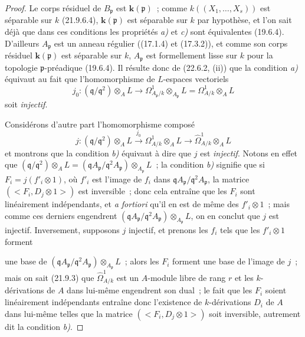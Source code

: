 \begin{proof}
Le corps résiduel de $B_{\mathfrak p}$ est $\boldsymbol{k}(\mathfrak p)$~; comme
$k((X_1,\ldots,X_s))$ est séparable sur $k$ (21.9.6.4), $\boldsymbol{k}(\mathfrak p)$ est
séparable sur $k$ par hypothèse, et l'on sait déjà que dans ces conditions les
propriétés \emph{a)} et \emph{c)} sont équivalentes (19.6.4). D'ailleurs
$A_{\mathfrak p}$ est un anneau régulier ((17.1.4) et (17.3.2)), et comme son
corps résiduel $\boldsymbol{k}(\mathfrak p)$ est séparable sur $k$, $A_{\mathfrak p}$ est
formellement lisse sur $k$ pour la topologie $\mathfrak p$-préadique
(19.6.4). Il résulte donc de (22.6.2, (ii)) que la condition \emph{a)} équivaut au
fait que l'homomorphisme de $L$-espaces vectoriels
\begin{equation}
\label{0.22.7.2.1-fr}
  j_0:(\mathfrak q/\mathfrak q^2)\otimes_AL
  \longrightarrow\Omega^1_{A_{\mathfrak p}/k}\otimes_{A_{\mathfrak p}}L
  =\Omega^1_{A/k}\otimes_AL
  \tag{22.7.2.1}
\end{equation}
soit \emph{injectif}.

Considérons d'autre part l'homomorphisme composé
\begin{equation}
\label{0.22.7.2.2-fr}
  j:(\mathfrak q/\mathfrak q^2)\otimes_AL
  \xrightarrow{j_0}\Omega^1_{A/k}\otimes_AL
  \longrightarrow\widehat\Omega^1_{A/k}\otimes_AL
  \tag{22.7.2.2}
\end{equation}
et montrons que la condition \emph{b)} équivaut à dire que $j$ est \emph{injectif}. Notons en
effet que
$(\mathfrak q/\mathfrak q^2)\otimes_AL
=(\mathfrak qA_{\mathfrak p}/\mathfrak q^2A_{\mathfrak p})
\otimes_{A_{\mathfrak p}}L$~;
la condition \emph{b)} signifie que si $F_i=j(f'_i\otimes1)$, où $f'_i$ est l'image
de $f_i$ dans
$\mathfrak qA_{\mathfrak p}/\mathfrak q^2A_{\mathfrak p}$, la matrice
$(\mathopen{<}F_i,D_j\otimes1\mathclose{>})$ est inversible~; donc cela entraîne que les
$F_i$ sont linéairement indépendants, et \emph{a fortiori} qu'il en est de
même des $f'_i\otimes1$~; mais comme ces derniers engendrent
$(\mathfrak qA_{\mathfrak p}/\mathfrak q^2A_{\mathfrak p})
\otimes_{A_{\mathfrak p}}L$, on en conclut que $j$ est injectif. Inversement,
supposons $j$ injectif, et prenons les $f_i$ tels que les $f'_i\otimes1$
forment


une base de
$(\mathfrak qA_{\mathfrak p}/\mathfrak q^2A_{\mathfrak p})
\otimes_{A_{\mathfrak p}}L$~; alors les $F_i$ forment une base de l'image de
$j$~; mais on sait (21.9.3) que $\widehat\Omega^1_{A/k}$ est un $A$-module
libre de rang $r$ et les $k$-dérivations de $A$ dans lui-même engendrent son
dual~; le fait que les $F_i$ soient linéairement indépendants entraîne donc
l'existence de $k$-dérivations $D_i$ de $A$ dans lui-même telles que la matrice
$(\mathopen{<}F_i,D_j\otimes1\mathclose{>})$ soit inversible, autrement dit la condition
\emph{b)}.


\end{proof}
